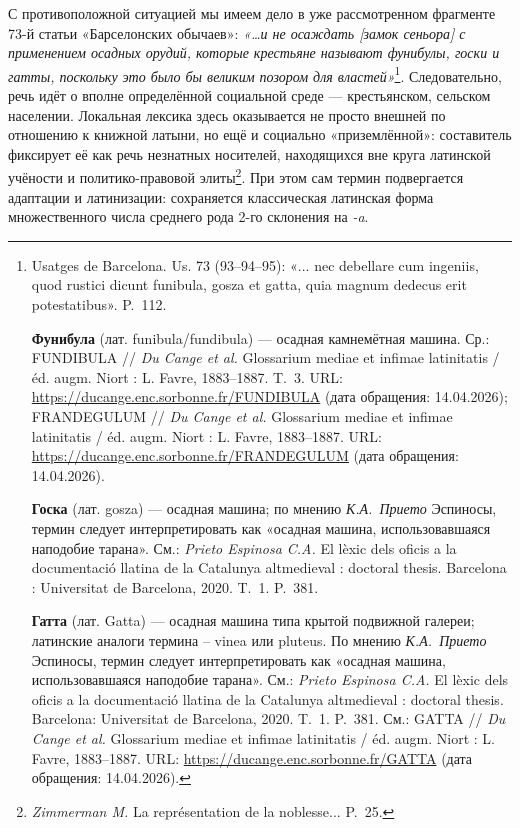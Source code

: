 С противоположной ситуацией мы имеем дело в уже рассмотренном фрагменте 73-й статьи «Барселонских обычаев»: \emph{«…и не осаждать [замок сеньора] с применением осадных орудий, которые крестьяне называют фунибулы, госки и гатты, поскольку это было бы великим позором для властей»}\footnote{Usatges de Barcelona. Us. 73 (93--94--95): «... nec debellare cum ingeniis, quod rustici dicunt funibula, gosza et gatta, quia magnum dedecus erit potestatibus». P.~112.\par \textbf{Фунибула} (лат. funibula/fundibula) --- осадная камнемётная машина. Ср.: FUNDIBULA // \emph{Du Cange et al.} Glossarium mediae et infimae latinitatis / éd. augm. Niort : L. Favre, 1883--1887. T.~3. URL: \url{https://ducange.enc.sorbonne.fr/FUNDIBULA} (дата обращения: 14.04.2026); FRANDEGULUM // \emph{Du Cange et al.} Glossarium mediae et infimae latinitatis / éd. augm. Niort : L. Favre, 1883--1887. URL: \url{https://ducange.enc.sorbonne.fr/FRANDEGULUM} (дата обращения: 14.04.2026).\par \textbf{Госка }(лат. gosza) --- осадная машина; по мнению \emph{К.А.~Прието} Эспиносы, термин следует интерпретировать как «осадная машина, использовавшаяся наподобие тарана». См.:\emph{ Prieto Espinosa C.A.} El lèxic dels oficis a la documentació llatina de la Catalunya altmedieval : doctoral thesis. Barcelona : Universitat de Barcelona, 2020. T.~1. P.~381.\par \textbf{Гатта} (лат. Gatta) --- осадная машина типа крытой подвижной галереи; латинские аналоги термина -- vinea или pluteus. По мнению \emph{К.А.~Прието} Эспиносы, термин следует интерпретировать как «осадная машина, использовавшаяся наподобие тарана». См.: \emph{Prieto Espinosa C.A.} El lèxic dels oficis a la documentació llatina de la Catalunya altmedieval : doctoral thesis. Barcelona: Universitat de Barcelona, 2020. T.~1. P.~381. См.: GATTA // \emph{Du Cange et al.} Glossarium mediae et infimae latinitatis / éd. augm. Niort : L. Favre, 1883--1887. URL: \url{https://ducange.enc.sorbonne.fr/GATTA} (дата обращения: 14.04.2026).}. Следовательно, речь идёт о вполне определённой социальной среде --- крестьянском, сельском населении. Локальная лексика здесь оказывается не просто внешней по отношению к книжной латыни, но ещё и социально «приземлённой»: составитель фиксирует её как речь незнатных носителей, находящихся вне круга латинской учёности и политико-правовой элиты\footnote{\emph{Zimmerman M. }La représentation de la noblesse... P.~25.}. При этом сам термин подвергается адаптации и латинизации: сохраняется классическая латинская форма множественного числа среднего рода 2-го склонения на \emph{-}\emph{a}.

